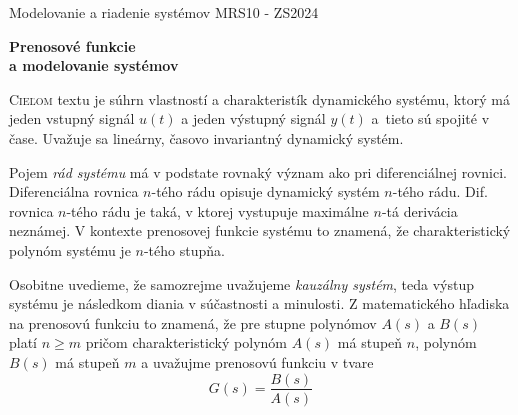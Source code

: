 \documentclass[a4paper, 10pt, ]{article}
\def\oznacenieCasti{MRS10 - ZS2024}
\begin{document}
\lstset{%
style=mystyle,
rangebeginprefix=\#\#\#\ cellB\ ,%
rangebeginsuffix=\ \#\#\#,%
rangeendprefix=\#\#\#\ cellE\ ,%
rangeendsuffix=\ \#\#\#,%
includerangemarker=false,
}





\fontsize{12pt}{22pt}\selectfont

\centerline{\textsf{Modelovanie a riadenie systémov} \hfill \textsf{\oznacenieCasti}}

\fontsize{18pt}{22pt}\selectfont





\begin{flushleft}
	\textbf{\textsf{Prenosové funkcie\\ a modelovanie systémov}}
\end{flushleft}





\normalsize

\bigskip

{\hypersetup{hidelinks}

\tableofcontents

}

\bigskip

\vspace{18pt}



\noindent
\lettrine[lines=1, nindent=1pt, loversize=0.0]{C}{ieľom} 
textu je súhrn vlastností a charakteristík dynamického systému, ktorý má jeden vstupný signál $u(t)$ a jeden výstupný signál $y(t)$ a~tieto sú spojité v čase. Uvažuje sa lineárny, časovo invariantný dynamický systém.

Pojem \emph{rád systému} má v podstate rovnaký význam ako pri diferenciálnej rovnici. Diferenciálna rovnica $n$-tého rádu opisuje dynamický systém $n$-tého rádu. Dif. rovnica $n$-tého rádu je taká, v ktorej vystupuje maximálne $n$-tá derivácia neznámej. V kontexte prenosovej funkcie systému to znamená, že charakteristický polynóm systému je $n$-tého stupňa.

Osobitne uvedieme, že samozrejme uvažujeme \emph{kauzálny systém}, teda výstup systému je následkom diania v súčastnosti a minulosti. Z matematického hľadiska na prenosovú funkciu to znamená, že pre stupne polynómov $A(s)$ a $B(s)$ platí $n \geq m$ pričom charakteristický polynóm $A(s)$ má stupeň $n$, polynóm $B(s)$ má stupeň $m$ a uvažujme prenosovú funkciu v tvare
\begin{equation}
    G(s) = \frac{B(s)}{A(s)}
\end{equation}
\end{document}

